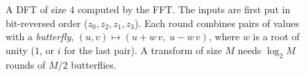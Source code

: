 \begin{figure}[!htb]
\centering

\caption{A DFT of size $4$ computed by the FFT. The inputs are first put in
bit-reversed order ($z_0,z_2,z_1,z_3$). Each round combines pairs of values
with a \emph{butterfly}, $(u,v)\mapsto(u+w\,v,\;u-w\,v)$, where $w$ is a root of
unity ($1$, or $i$ for the last pair). A transform of size $M$ needs $\log_2M$
rounds of $M/2$ butterflies.}
\label{fig:butterfly}
\end{figure}
